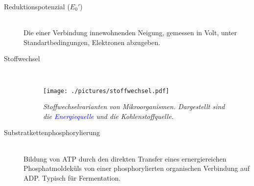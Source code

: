 \begin{description}
	\item[Reduktionspotenzial ($E_0'$)] \hfill \\
		Die einer Verbindung innewohnenden Neigung,
		gemessen in Volt,
		unter Standartbedingungen,
		Elektronen abzugeben.

	 \item[Stoffwechsel] \hfill \\

		\begin{figure}[ht!]
		\leavevmode
		\begin{center}
		\texttt{[image: ./pictures/stoffwechsel.pdf]}
		\end{center}
		\caption{\slshape{Stoffwechselvarianten von Mikroorganismen.
								Dargestellt sind die \textcolor{blue}{Energiequelle} und die Kohlenstoffquelle.}}
		\label{fig:Stoffwechselvarianten}
		\end{figure}

	\item[Substratkettenphosphorylierung]	\hfill	\\
		Bildung von ATP durch den direkten Transfer eines ernergiereichen
		Phosphatmoldeküls von einer phosphorylierten organischen Verbindung
		auf ADP.
		Typisch für Fermentation.
\end{description}
